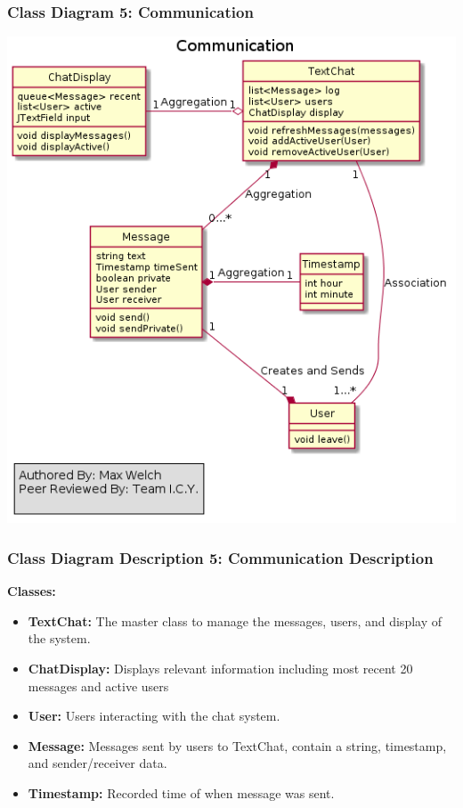 \documentclass[twoside,letterpaper]{article}
\begin{document}
{\newpage
\subsubsection[Class Diagram 5: Communication]{\rmfamily\bfseries\color{black}
	Class Diagram 5: Communication}
\hypertarget{RefHeading22059017292}{}
\bigskip

\includegraphics[width=\textwidth]{images/ClassDiagrams/Communication}

\newpage
\subsubsection[Class Diagram Description 5: Communication Description]{\rmfamily\bfseries\color{black}
	Class Diagram Description 5: Communication Description}
\hypertarget{RefHeading22059017292}{}

\textbf{Classes:}
\begin{itemize}

	\item \textbf{TextChat:} The master class to manage the messages, users, and display of the system.
	\item \textbf{ChatDisplay:} Displays relevant information including most recent 20 messages and active users
	\item \textbf{User:} Users interacting with the chat system.
	\item \textbf{Message:} Messages sent by users to TextChat, contain a string, timestamp, and sender/receiver data.
	\item \textbf{Timestamp:} Recorded time of when message was sent.
\end{itemize}
\newpage	

}
\end{document}
